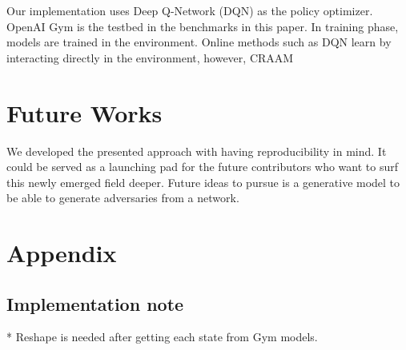 \documentclass{article}
\begin{document}
    Our implementation uses Deep Q-Network (DQN) \cite{Mnih2015} as the policy optimizer. OpenAI Gym \cite{BrockmanOpenAIGym} is the testbed in the benchmarks in this paper. In training phase, models are trained in the environment. Online methods such as DQN learn by interacting directly in the environment, however, CRAAM




    \section{Future Works}
    We developed the presented approach with having reproducibility in mind. It could be served as a launching pad for the future contributors who want to surf this newly emerged field deeper. Future ideas to pursue is a generative model to be able to generate adversaries from a network.

    \section*{Appendix}

    \subsection{Implementation note}
    * Reshape is needed after getting each state from Gym models.




    
    





\end{document}
